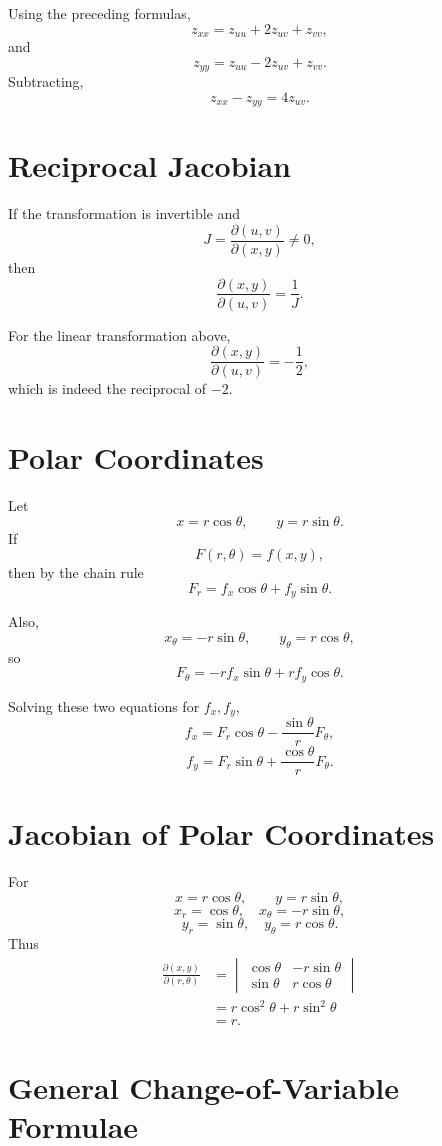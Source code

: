 \documentclass[11pt,oneside]{book}
\theoremstyle{studentthm}
\theoremstyle{definition}
\begin{document}
Using the preceding formulas,
\[
z_{xx}
=
z_{uu}+2z_{uv}+z_{vv},
\]
and
\[
z_{yy}
=
z_{uu}-2z_{uv}+z_{vv}.
\]
Subtracting,
\[
z_{xx}-z_{yy}=4z_{uv}.
\]

\section{Reciprocal Jacobian}

If the transformation is invertible and
\[
J=
\frac{\partial(u,v)}{\partial(x,y)}
\ne0,
\]
then
\[
\frac{\partial(x,y)}{\partial(u,v)}
=
\frac1J.
\]

For the linear transformation above,
\[
\frac{\partial(x,y)}{\partial(u,v)}
=
-\frac12,
\]
which is indeed the reciprocal of \(-2\).

\section{Polar Coordinates}

Let
\[
x=r\cos\theta,
\qquad
y=r\sin\theta.
\]
If
\[
F(r,\theta)=f(x,y),
\]
then by the chain rule
\[
F_r
=
f_x\cos\theta+f_y\sin\theta.
\]

Also,
\[
x_\theta=-r\sin\theta,
\qquad
y_\theta=r\cos\theta,
\]
so
\[
F_\theta
=
-rf_x\sin\theta
+
rf_y\cos\theta.
\]

Solving these two equations for \(f_x,f_y\),
\[
f_x
=
F_r\cos\theta
-
\frac{\sin\theta}{r}F_\theta,
\]
\[
f_y
=
F_r\sin\theta
+
\frac{\cos\theta}{r}F_\theta.
\]

\section{Jacobian of Polar Coordinates}

For
\[
x=r\cos\theta,\qquad y=r\sin\theta,
\]
\[
x_r=\cos\theta,
\quad
x_\theta=-r\sin\theta,
\]
\[
y_r=\sin\theta,
\quad
y_\theta=r\cos\theta.
\]
Thus
\[
\begin{aligned}
\frac{\partial(x,y)}{\partial(r,\theta)}
&=
\begin{vmatrix}
\cos\theta&-r\sin\theta\\
\sin\theta&r\cos\theta
\end{vmatrix}\\
&=
r\cos^2\theta+r\sin^2\theta\\
&=r.
\end{aligned}
\]


\section{General Change-of-Variable Formulae}
\end{document}
